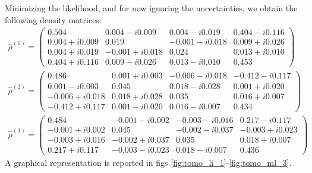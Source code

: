 \documentclass[a4paper, 11pt]{article}
\begin{document}
      Minimizing the likelihood, and for now ignoring the uncertainties, we obtain the following density matrices:
      \begin{gather*}
        \hat{\rho}^{(1)} =
        \begin{pmatrix}
          0.504  & 0.004 -i0.009 & 0.004 -i0.019 & 0.404 -i0.116 \\
          0.004 +i0.009 & 0.019  & -0.001 -i0.018 & 0.009 +i0.026 \\
          0.004 +i0.019 & -0.001 +i0.018 & 0.024  & 0.013 +i0.010 \\
          0.404 +i0.116 & 0.009 -i0.026 & 0.013 -i0.010 & 0.453
        \end{pmatrix}
        \\
        \hat{\rho}^{(2)} =
        \begin{pmatrix}
          0.486  & 0.001 +i0.003 & -0.006 -i0.018 & -0.412 -i0.117 \\
          0.001 -i0.003 & 0.045  & 0.018 -i0.028 & 0.001 +i0.020 \\
          -0.006 +i0.018 & 0.018 +i0.028 & 0.035  & 0.016 +i0.007 \\
          -0.412 +i0.117 & 0.001 -i0.020 & 0.016 -i0.007 & 0.434
        \end{pmatrix}
        \\
        \hat{\rho}^{(3)} =
        \begin{pmatrix}
          0.484  & -0.001 -i0.002 & -0.003 -i0.016 & 0.217 -i0.117 \\
          -0.001 +i0.002 & 0.045  & -0.002 -i0.037 & -0.003 +i0.023 \\
          -0.003 +i0.016 & -0.002 +i0.037 & 0.035  & 0.018 +i0.007 \\
          0.217 +i0.117 & -0.003 -i0.023 & 0.018 -i0.007 & 0.436
        \end{pmatrix}
      \end{gather*}
      A graphical representation is reported in figs \ref{fig:tomo_li_1}-\ref{fig:tomo_ml_3}.
\end{document}
